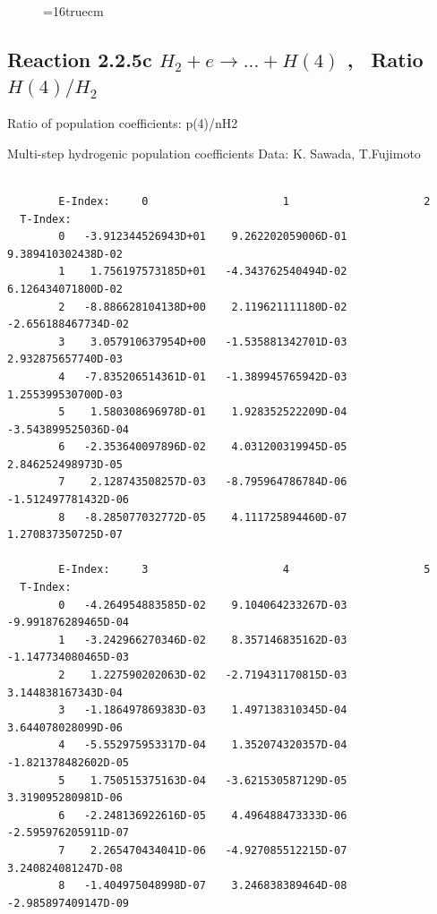 \documentclass[12pt,dvipdfmx]{article}
\begin{document}
\begin{small}
\begin{verbatim}
\end{verbatim}\end{small}
\begin{figure} \label{2.2.5b}
\epsfxsize=16truecm
\end{figure}
\newpage

\subsection{
Reaction 2.2.5c  $H_2 + e \rightarrow ...+ H(4) $ , \   Ratio $H(4)/H_2 $
}

 Ratio of population coefficients: p(4)/nH2

 Multi-step hydrogenic population coefficients
 Data: K. Sawada, T.Fujimoto \cite{kn:Sawada}

\begin{small}\begin{verbatim}

        E-Index:     0                     1                     2
  T-Index:
        0   -3.912344526943D+01    9.262202059006D-01    9.389410302438D-02
        1    1.756197573185D+01   -4.343762540494D-02    6.126434071800D-02
        2   -8.886628104138D+00    2.119621111180D-02   -2.656188467734D-02
        3    3.057910637954D+00   -1.535881342701D-03    2.932875657740D-03
        4   -7.835206514361D-01   -1.389945765942D-03    1.255399530700D-03
        5    1.580308696978D-01    1.928352522209D-04   -3.543899525036D-04
        6   -2.353640097896D-02    4.031200319945D-05    2.846252498973D-05
        7    2.128743508257D-03   -8.795964786784D-06   -1.512497781432D-06
        8   -8.285077032772D-05    4.111725894460D-07    1.270837350725D-07

        E-Index:     3                     4                     5
  T-Index:
        0   -4.264954883585D-02    9.104064233267D-03   -9.991876289465D-04
        1   -3.242966270346D-02    8.357146835162D-03   -1.147734080465D-03
        2    1.227590202063D-02   -2.719431170815D-03    3.144838167343D-04
        3   -1.186497869383D-03    1.497138310345D-04    3.644078028099D-06
        4   -5.552975953317D-04    1.352074320357D-04   -1.821378482602D-05
        5    1.750515375163D-04   -3.621530587129D-05    3.319095280981D-06
        6   -2.248136922616D-05    4.496488473333D-06   -2.595976205911D-07
        7    2.265470434041D-06   -4.927085512215D-07    3.240824081247D-08
        8   -1.404975048998D-07    3.246838389464D-08   -2.985897409147D-09


\end{verbatim}
\end{small}
\end{document}

